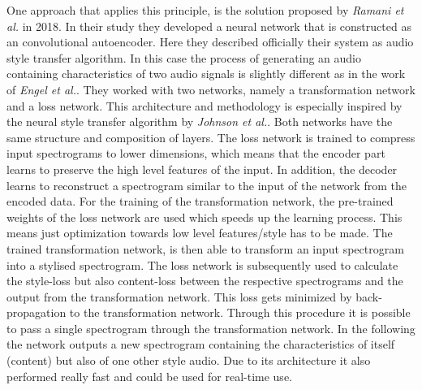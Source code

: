 One approach that applies this principle, is the solution proposed by \textit{Ramani et al.} in 2018. \cite{Ramani2018} In their study they developed a neural network that is constructed as an convolutional autoencoder. Here they described officially their system as audio style transfer algorithm. In this case the process of generating an audio containing characteristics of two audio signals is slightly different as in the work of \textit{Engel et al.}. They worked with two networks, namely a transformation network and a loss network. This architecture and methodology is especially inspired by the neural style transfer algorithm by \textit{Johnson et al.}. Both networks have the same structure and composition of layers. The loss network is trained to compress input spectrograms to lower dimensions, which means that the encoder part learns to preserve the high level features of the input. In addition, the decoder learns to reconstruct a spectrogram similar to the input of the network from the encoded data. For the training of the transformation network, the pre-trained weights of the loss network are used which speeds up the learning process. This means just optimization towards low level features/style has to be made. The trained transformation network, is then able to transform an input spectrogram into a stylised spectrogram. The loss network is subsequently used to calculate the style-loss but also content-loss between the respective spectrograms and the output from the transformation network. This loss gets minimized by back-propagation to the transformation network. Through this procedure it is possible to pass a single spectrogram through the transformation network. In the following the network outputs a new spectrogram containing the characteristics of itself (content) but also of one other style audio. Due to its architecture it also performed really fast and could be used for real-time use.\\

